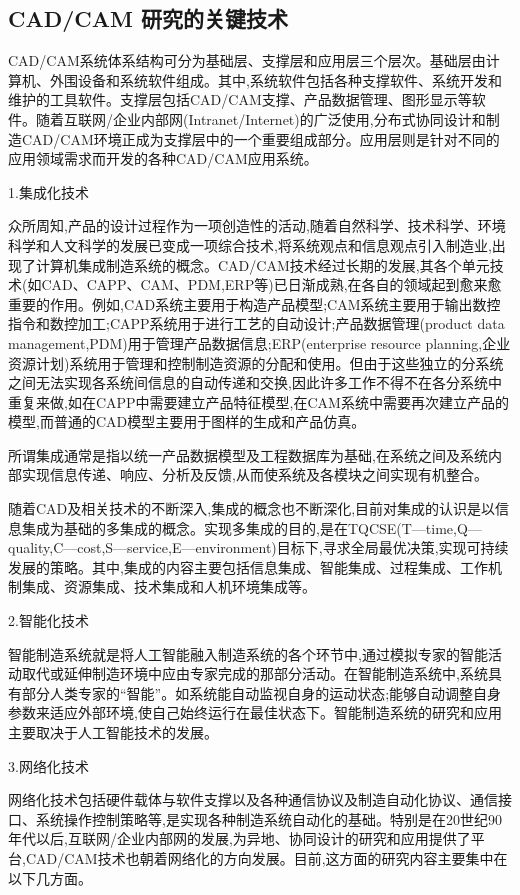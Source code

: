 \documentclass[UTF8]{ctexbook}
\newcommand{\◎}{\ensuremath{\bigcirc}}
\begin{document}
\subsection{CAD/CAM 研究的关键技术}
CAD/CAM系统体系结构可分为基础层、支撑层和应用层三个层次。基础层由计算机、外围设备和系统软件组成。其中,系统软件包括各种支撑软件、系统开发和维护的工具软件。支撑层包括CAD/CAM支撑、产品数据管理、图形显示等软件。随着互联网/企业内部网(Intranet/Internet)的广泛使用,分布式协同设计和制造CAD/CAM环境正成为支撑层中的一个重要组成部分。应用层则是针对不同的应用领域需求而开发的各种CAD/CAM应用系统。

1.集成化技术
    
    众所周知,产品的设计过程作为一项创造性的活动,随着自然科学、技术科学、环境科学和人文科学的发展已变成一项综合技术,将系统观点和信息观点引入制造业,出现了计算机集成制造系统的概念。CAD/CAM技术经过长期的发展,其各个单元技术(如CAD、CAPP、CAM、PDM,ERP等)已日渐成熟,在各自的领域起到愈来愈重要的作用。例如,CAD系统主要用于构造产品模型;CAM系统主要用于输出数控指令和数控加工;CAPP系统用于进行工艺的自动设计;产品数据管理(product data management,PDM)用于管理产品数据信息;ERP(enterprise resource planning,企业资源计划)系统用于管理和控制制造资源的分配和使用。但由于这些独立的分系统之间无法实现各系统间信息的自动传递和交换,因此许多工作不得不在各分系统中重复来做,如在CAPP中需要建立产品特征模型,在CAM系统中需要再次建立产品的模型,而普通的CAD模型主要用于图样的生成和产品仿真。
    
    所谓集成通常是指以统一产品数据模型及工程数据库为基础,在系统之间及系统内部实现信息传递、响应、分析及反馈,从而使系统及各模块之间实现有机整合。
    
    随着CAD及相关技术的不断深入,集成的概念也不断深化,目前对集成的认识是以信息集成为基础的多集成的概念。实现多集成的目的,是在TQCSE(T—time,Q—quality,C—cost,S—service,E—environment)目标下,寻求全局最优决策,实现可持续发展的策略。其中,集成的内容主要包括信息集成、智能集成、过程集成、工作机制集成、资源集成、技术集成和人机环境集成等。
    
2.智能化技术
    
    智能制造系统就是将人工智能融入制造系统的各个环节中,通过模拟专家的智能活动取代或延伸制造环境中应由专家完成的那部分活动。在智能制造系统中,系统具有部分人类专家的“智能”。如系统能自动监视自身的运动状态;能够自动调整自身参数来适应外部环境,使自己始终运行在最佳状态下。智能制造系统的研究和应用主要取决于人工智能技术的发展。
    
3.网络化技术
    
    网络化技术包括硬件载体与软件支撑以及各种通信协议及制造自动化协议、通信接口、系统操作控制策略等,是实现各种制造系统自动化的基础。特别是在20世纪90年代以后,互联网/企业内部网的发展,为异地、协同设计的研究和应用提供了平台,CAD/CAM技术也朝着网络化的方向发展。目前,这方面的研究内容主要集中在以下几方面。
\end{document}
